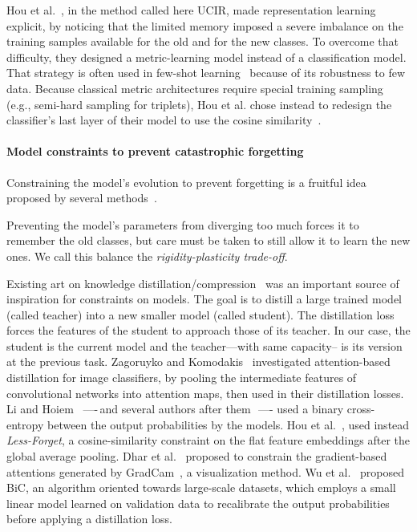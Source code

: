 Hou et al.~\citep{hou2019ucir}, in the method called here UCIR, made representation learning
explicit, by noticing that the limited memory imposed a severe imbalance on the training samples
available for the old and for the new classes. To overcome that difficulty, they designed a
metric-learning model instead of a classification model. That strategy is often used in few-shot
learning~\citep{gidaris2018fewshot_wo_forgetting} because of its robustness to few data. Because
classical metric architectures require special training sampling (e.g., semi-hard sampling for
triplets), Hou et al. chose instead to redesign the classifier's last layer of their model to use
the cosine similarity~\citep{luo2018cosine_classifier}.

\paragraph{Model constraints to prevent catastrophic forgetting} Constraining the model's evolution to
prevent forgetting is a fruitful idea proposed by several
methods~\citep{kirkpatrick2017ewc,lopezpaz2017gem,aljundi2018MemoryAwareSynapses,li2018lwf,rebuffi2017icarl,castro2018end_to_end_inc_learn}.

Preventing the model's parameters from diverging too much forces it to remember the old classes, but
care must be taken to still allow it to learn the new ones. We call this balance the
\textit{rigidity-plasticity trade-off}.

Existing art on knowledge distillation/compression~\citep{hinton2015knowledge_distillation} was an
important source of inspiration for constraints on models. The goal is to distill a large trained
model (called teacher) into a new smaller model (called student). The distillation loss forces the
features of the student to approach those of its teacher. In our case, the student is the current
model and the teacher---with same capacity-- is its version at the previous task. Zagoruyko and
Komodakis~\citep{komodakis2017attention_residual_distillation} investigated attention-based
distillation for image classifiers, by pooling the intermediate features of convolutional networks
into attention maps, then used in their distillation losses. Li and Hoiem~\citep{li2018lwf} —-\,and
several authors after
them~\citep{rebuffi2017icarl,castro2018end_to_end_inc_learn,wu2019bias_correction}\,—- used a binary
cross-entropy between the output probabilities by the models. Hou et al.~\citep{hou2019ucir}, used
instead \textit{Less-Forget}, a cosine-similarity constraint on the flat feature embeddings after
the global average pooling. Dhar et al.~\citep{dhar2019learning_without_memorizing_gradcam} proposed
to constrain the gradient-based attentions generated by GradCam~\citep{selvaraju2017gradcam}, a
visualization method. Wu et al.~\citep{wu2019bias_correction} proposed BiC, an algorithm oriented
towards large-scale datasets, which employs a small linear model learned on validation data to
recalibrate the output probabilities before applying a distillation loss.

